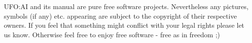 





UFO:AI and its manual are pure free software projects. Nevertheless any pictures, symbols (if any) etc. appearing are subject to the copyright of their respective owners. If you feel that something might conflict with your legal rights please let us know. Otherwise feel free to enjoy free software - free as in freedom ;) 

\maketitle
\newpage
\tableofcontents





\appendix


